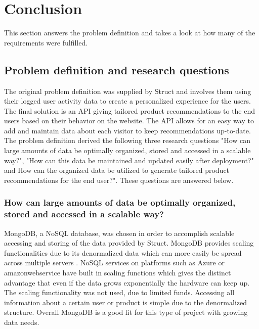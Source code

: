 
\chapter{Conclusion} %

\label{Conclusion} %


This section answers the problem definition and takes a look at how many of the requirements were fulfilled.

\section{Problem definition and research questions}

The original problem definition was supplied by \gls{Struct} and involves them using their logged user activity data to create a personalized experience for the users. The final solution is an \gls{API} giving tailored product recommendations to the end users based on their behavior on the website. The \gls{API} allows for an easy way to add and maintain data about each visitor to keep recommendations up-to-date. \\
The problem definition derived the following three research questions "How can large amounts of data be optimally organized, stored and accessed in a scalable way?",  "How can this data be maintained and updated easily after deployment?" and How can the organized data be utilized to generate tailored product recommendations for the end user?". These questions are answered below.

\subsection{How can large amounts of data be optimally organized, stored and accessed in a scalable way?}
\gls{MongoDB}, a \gls{NoSQL} database, was chosen in order to accomplish scalable accessing and storing of the data provided by \gls{Struct}. \gls{MongoDB} provides scaling functionalities due to its denormalized data which can more easily be spread across multiple servers \cite{SQLvsNOSQL}. \gls{NoSQL} services on platforms such as Azure or \gls{amazonwebservice} have built in scaling functions \cite{azureNoSQL} which gives the distinct advantage that even if the data grows exponentially the hardware can keep up. The scaling functionality was not used, due to limited funds. Accessing all information about a certain user or product is simple due to the denormalized structure. Overall \gls{MongoDB} is a good fit for this type of project with growing data needs.

